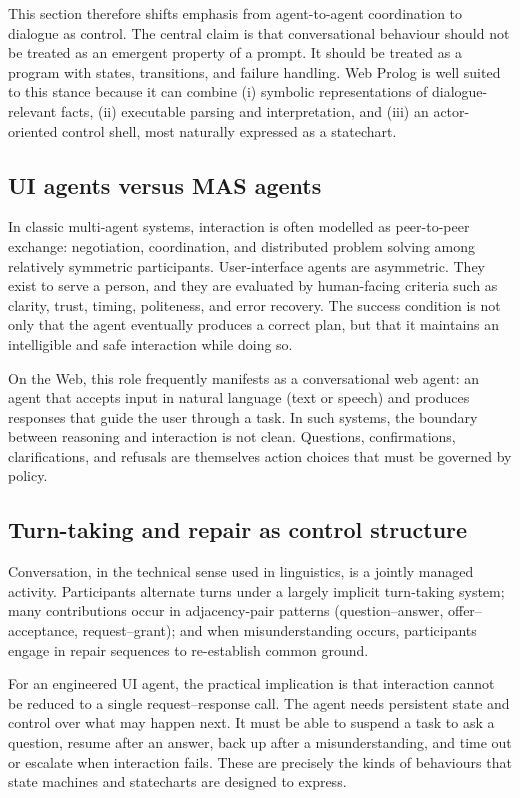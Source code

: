 This section therefore shifts emphasis from agent-to-agent coordination to dialogue as control. The central claim is that conversational behaviour should not be treated as an emergent property of a prompt. It should be treated as a program with states, transitions, and failure handling. Web Prolog is well suited to this stance because it can combine (i) symbolic representations of dialogue-relevant facts, (ii) executable parsing and interpretation, and (iii) an actor-oriented control shell, most naturally expressed as a statechart.

\subsection{UI agents versus MAS agents}
\label{sec:ui-agents-versus-mas}

In classic multi-agent systems, interaction is often modelled as peer-to-peer exchange: negotiation, coordination, and distributed problem solving among relatively symmetric participants. User-interface agents are asymmetric. They exist to serve a person, and they are evaluated by human-facing criteria such as clarity, trust, timing, politeness, and error recovery. The success condition is not only that the agent eventually produces a correct plan, but that it maintains an intelligible and safe interaction while doing so.

On the Web, this role frequently manifests as a conversational web agent: an agent that accepts input in natural language (text or speech) and produces responses that guide the user through a task. In such systems, the boundary between reasoning and interaction is not clean. Questions, confirmations, clarifications, and refusals are themselves action choices that must be governed by policy.

\subsection{Turn-taking and repair as control structure}
\label{sec:turn-taking-and-repair}

Conversation, in the technical sense used in linguistics, is a jointly managed activity. Participants alternate turns under a largely implicit turn-taking system; many contributions occur in adjacency-pair patterns (question--answer, offer--acceptance, request--grant); and when misunderstanding occurs, participants engage in repair sequences to re-establish common ground.

For an engineered UI agent, the practical implication is that interaction cannot be reduced to a single request--response call. The agent needs persistent state and control over what may happen next. It must be able to suspend a task to ask a question, resume after an answer, back up after a misunderstanding, and time out or escalate when interaction fails. These are precisely the kinds of behaviours that state machines and statecharts are designed to express.

